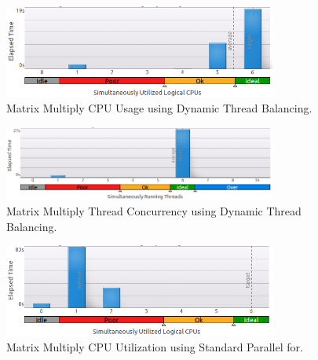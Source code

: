 \documentclass[journal,10pt,onecolumn,draftcls]{IEEEtran}
\begin{document}
\begin{figure}[htb]
\label{fig:matrix_dynamic_schedule_cpu_usage}
\begin{center}
\includegraphics[width=0.8\textwidth]{figures/matrix_dynamic_schedule_cpu_usage.png}
\caption{Matrix Multiply CPU Usage using Dynamic Thread Balancing.}
\end{center}
\end{figure}

\begin{figure}[htb]
\label{fig:matrix_dynamic_schedule_concurrency}
\begin{center}
\includegraphics[width=0.8\textwidth]{figures/matrix_dynamic_schedule_thread_concurrency.png}
\caption{Matrix Multiply Thread Concurrency using Dynamic Thread Balancing.}
\end{center}
\end{figure}

\begin{figure}[htb]
\label{fig:matrix_wo_dynamic_schedule_cpu_usage}
\begin{center}
\includegraphics[width=0.8\textwidth]{figures/matrix_without_dynamic_schedule_cpu_usage.png}
\caption{Matrix Multiply CPU Utilization using Standard Parallel for.}
\end{center}
\end{figure}
\end{document}
